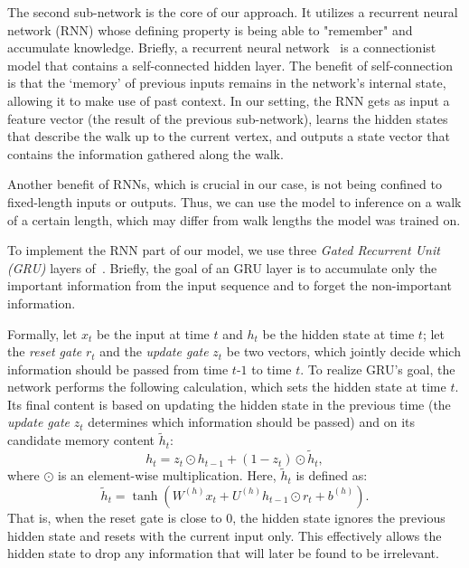 \documentclass[acmtog]{acmart}
\begin{document}
The second sub-network is the core of our approach.
It utilizes a recurrent neural network (RNN) whose defining property is being able to "remember" and accumulate knowledge.
Briefly, a recurrent neural network~\cite{graves2008novel,hochreiter1997long,cho2014learning} is a  connectionist model that contains a self-connected hidden layer. 
The benefit of self-connection is that the ‘memory’ of previous inputs remains in the network’s internal state, allowing it to make use of past context.
In our setting, the RNN gets as input a feature vector  (the result of the previous sub-network), learns the hidden states that describe the walk up to the current vertex, and outputs a state vector that contains the  information gathered along the walk. 

Another benefit of RNNs, which is crucial in our case, is not being confined to fixed-length inputs or outputs.
Thus, we can use the model to inference on a walk of a certain length, which may differ from walk lengths the model was trained on.

To implement the RNN part of our model, we use three {\em Gated Recurrent Unit (GRU)} layers of~\cite{cho2014learning}.
Briefly, the goal of an GRU layer is to accumulate only the important information from the input sequence and to forget the non-important information.

Formally, let $x_t$ be the input at time $t$ and $h_t$ be the hidden state at time $t$;
let the {\em reset gate} $r_t$ and the {\em update gate} $z_t$ be two vectors, which jointly decide which information should be passed from time $t$-$1$ to time $t$.
To realize GRU's goal, the network performs the following calculation, which sets the hidden state at time $t$.
Its final content is based on updating the hidden state in the previous time (the {\em update gate} $z_t$ determines which information should be passed) and on its candidate memory content $\tilde{h}_{t}$:
\begin{equation}
\label{eq:ht}
h_{t}= z_{t} \odot h_{t-1} + \left(1-z_{t}\right) \odot \tilde{h}_{t},
\end{equation}
where $\odot$ is an element-wise multiplication.
Here, $\tilde{h}_{t}$ is defined as:
\begin{equation}
\label{eq:h-tilde}
\tilde{h}_{t}=\tanh \left(W^{(h)} x_{t}+U^{(h)} h_{t-1} \odot r_{t}+b^{(h)}\right).
\end{equation}
That is, when the reset gate is close to $0$, the hidden state ignores the previous hidden state and resets with the current input only.
This effectively allows the hidden state to drop any information that will later be found to be irrelevant.
\end{document}
